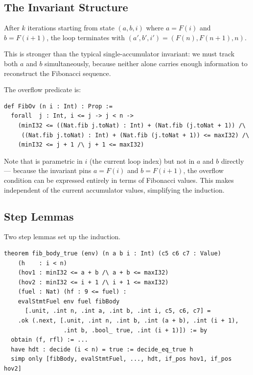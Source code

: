 \subsection{The Invariant Structure}

\begin{definition}
After $k$ iterations starting from state $(a, b, i)$ where
$a = F(i)$ and $b = F(i+1)$, the loop terminates with
$(a', b', i') = (F(n), F(n+1), n)$.
\end{definition}

This is stronger than the typical single-accumulator invariant: we must
track both $a$ and $b$ simultaneously, because neither alone carries enough
information to reconstruct the Fibonacci sequence.

The overflow predicate is:

\begin{lstlisting}[caption={FibOv: overflow condition for fib.},label={lst:fibov}]
def FibOv (n i : Int) : Prop :=
  forall  j : Int, i <= j -> j < n ->
    (minI32 <= ((Nat.fib j.toNat) : Int) + (Nat.fib (j.toNat + 1)) /\
     ((Nat.fib j.toNat) : Int) + (Nat.fib (j.toNat + 1)) <= maxI32) /\
    (minI32 <= j + 1 /\ j + 1 <= maxI32)
\end{lstlisting}

Note that \FibOv is parametric in $i$ (the current loop index) but not
in $a$ and $b$ directly — because the invariant pins $a = F(i)$ and $b = F(i+1)$,
the overflow condition can be expressed entirely in terms of Fibonacci values.
This makes \FibOv independent of the current accumulator values, simplifying
the induction.

\subsection{Step Lemmas}

Two step lemmas set up the induction.

\begin{lstlisting}[caption={fib\_body\_true: true branch step lemma.},label={lst:fibbt}]
theorem fib_body_true (env) (n a b i : Int) (c5 c6 c7 : Value)
    (h    : i < n)
    (hov1 : minI32 <= a + b /\ a + b <= maxI32)
    (hov2 : minI32 <= i + 1 /\ i + 1 <= maxI32)
    (fuel : Nat) (hf : 9 <= fuel) :
    evalStmtFuel env fuel fibBody
      [.unit, .int n, .int a, .int b, .int i, c5, c6, c7] =
    .ok (.next, [.unit, .int n, .int b, .int (a + b), .int (i + 1),
                 .int b, .bool_ true, .int (i + 1)]) := by
  obtain (f, rfl) := ...
  have hdt : decide (i < n) = true := decide_eq_true h
  simp only [fibBody, evalStmtFuel, ..., hdt, if_pos hov1, if_pos hov2]
\end{lstlisting}

